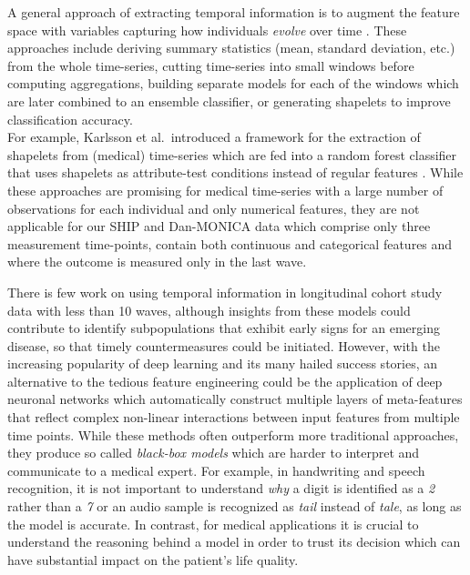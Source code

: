 \documentclass[
]{book}
\begin{document}
A general approach of extracting temporal information is to augment the feature space with variables capturing
how individuals \emph{evolve} over time \autocite{Orphanou:AIM2014,Singh:BiomedInformatics2015,Zhao:BiomedInformatics2017}.
These approaches include deriving summary statistics (mean, standard deviation, etc.) from the whole time-series,
cutting time-series into small windows before computing aggregations,
building separate models for each of the windows which are later combined to an ensemble classifier,
or generating shapelets to improve classification accuracy.\\
For example, Karlsson et al.~introduced a framework for the extraction of
shapelets from (medical) time-series which are fed into a random forest classifier
that uses shapelets as attribute-test conditions instead of regular features \autocite{Karlsson:DAMI2016}.
While these approaches are promising for medical time-series with a large number
of observations for each individual and only numerical features, they are not
applicable for our SHIP and Dan-MONICA data which comprise only three measurement time-points, contain both continuous and categorical features and where the outcome is measured only in the last wave.

There is few work on using temporal information in longitudinal cohort study data with less than 10 waves,
although insights from these models could contribute to identify subpopulations that exhibit early signs for an emerging disease, so that timely countermeasures could be initiated.
However, with the increasing popularity of deep learning and its many hailed success stories, an alternative to the tedious feature engineering could be the application of deep neuronal networks which automatically construct multiple layers of meta-features that reflect complex non-linear interactions between input features from multiple time points.
While these methods often outperform more traditional approaches, they produce so called \emph{black-box models} which are harder to interpret and communicate to a medical expert.
For example, in handwriting and speech recognition, it is not important to understand \emph{why} a digit is identified as a \emph{2} rather than a \emph{7} or an audio sample is recognized as \emph{tail} instead of \emph{tale}, as long as the model is accurate.
In contrast, for medical applications it is crucial to understand the reasoning behind a model in order to trust its decision which can have substantial impact on the patient's life quality.
\end{document}
